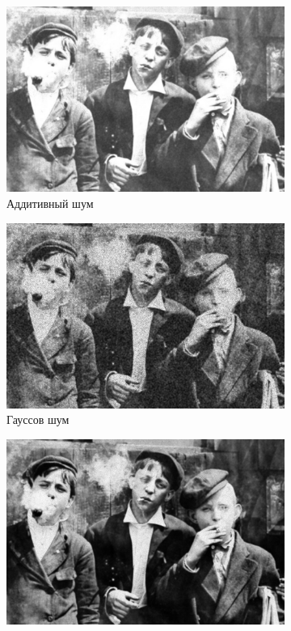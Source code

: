 \begin{figure}[ht!]
\begin{subfigure}[b]{0.5\linewidth}
      \includegraphics[width=0.95\linewidth]{../Wiener_Filter/Wiener_Additive_noise_(k=5).jpg} 
      \caption{Аддитивный шум} 
      \label{weiner_5:c} 
      \vspace{4ex}
    \end{subfigure}%
    \begin{subfigure}[b]{0.5\linewidth}
      \centering
      \includegraphics[width=0.95\linewidth]{../Wiener_Filter/Wiener_Gaussian_noise_(k=5).jpg} 
      \caption{Гауссов шум} 
      \label{weiner_5:d} 
      \vspace{4ex}
    \end{subfigure}
    \begin{subfigure}[b]{0.5\linewidth}
      \centering
      \includegraphics[width=0.95\linewidth]{../Wiener_Filter/Wiener_Poisson_noise_(k=5).jpg} 

\end{subfigure}
\end{figure}
